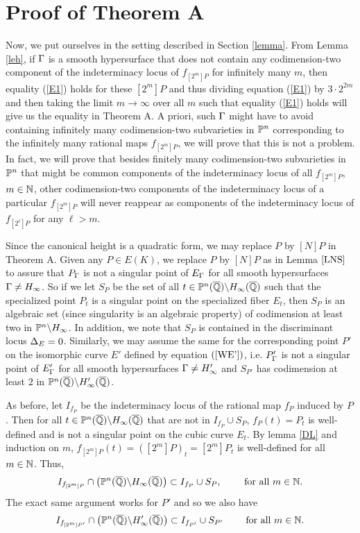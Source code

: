 \documentclass[12pt,reqno]{amsart}
\begin{document}
\section{Proof of Theorem A} \label{P}
Now, we put ourselves in the setting described in Section \ref{lemma}. From Lemma \ref{leh}, if $\Gamma$ is a smooth hypersurface that does not contain any codimension-two component of the indeterminacy locus of $f_{[2^m]P}$ for infinitely many $m$, then equality (\ref{E1}) holds for these $[2^m]P$ and thus dividing equation (\ref{E1}) by $3 \cdot 2^{2m}$ and then taking the  limit $m\rightarrow \infty$ over all $m$ such that equality (\ref{E1}) holds will give us the equality in Theorem A. A priori, such $\Gamma$ might have to avoid containing infinitely many codimension-two subvarieties in $\mathbb{P}^n$ corresponding to the infinitely many rational maps $f_{[2^m]P}$, we will prove that this is not a problem. In fact, we will prove that besides finitely many codimension-two subvarieties in $\mathbb{P}^n$ that might be common components of the indeterminacy locus of all $f_{[2^m]P}$, $m \in \mathbb{N}$, other  codimension-two components of the indeterminacy locus of a particular $f_{[2^m]P}$ will never reappear as components of the indeterminacy locus of  $f_{[2^\ell]P}$ for any $\ell > m$.

Since the canonical height is a quadratic form, we may replace $P$ by $[N]P$ in Theorem A. Given any $P \in E(K)$, we replace $P$ by $[N]P$ as in Lemma $\ref{LNS}$ to assure that $P_\Gamma$ is not a singular point of $E_\Gamma$ for all smooth hypersurfaces $\Gamma \neq H_\infty$. So if we let $S_P$ be the set of all $t \in \mathbb{P}^n(\overline{\mathbb{Q}})\backslash H_\infty(\overline{\mathbb{Q}})$ such that the specialized point $P_t$ is a singular point on the specialized fiber $E_t$, then $S_P$ is an algebraic set (since singularity is an algebraic property) of codimension at least two in $\mathbb{P}^n\backslash H_\infty$. In addition, we note that $S_P$ is contained in the discriminant locus $\Delta_E=0$. Similarly, we may assume the same for the corresponding point $P'$ on the isomorphic curve $E'$ defined by equation $(\ref{WE'})$, i.e. $P'_\Gamma$ is not a singular point of $E'_\Gamma$  for all smooth hypersurfaces $\Gamma \neq H'_\infty$ and $S_{P'}$ has codimension at least $2$ in $\mathbb{P}^n(\overline{\mathbb{Q}})\backslash H'_\infty(\overline{\mathbb{Q}})$.


As before, let $I_{f_P}$ be the indeterminacy locus of the rational map $f_P$ induced by $P$. Then for all $t \in \mathbb{P}^n(\overline{\mathbb{Q}})\backslash H_\infty(\overline{\mathbb{Q}})$ that are not in $I_{f_P} \cup S_P$, $f_P(t)=P_t$ is well-defined and is not a singular point on the cubic curve $E_t$. By lemma \ref{DL} and induction on $m$, $f_{[2^m]P}(t)=\left( [2^m]P\right)_t=[2^m]P_t$ is well-defined for all $m \in \mathbb{N}$. Thus, $$I_{f_{[2^m]P}} \cap \left(\mathbb{P}^n(\overline{\mathbb{Q}})\backslash H_\infty(\overline{\mathbb{Q}}) \right) \subset I_{f_P}\cup S_P, \qquad\text{ for all }m \in \mathbb{N}.$$ The exact same argument works for $P'$ and so we also have $$I_{f_{[2^m]P'}} \cap \left(\mathbb{P}^n(\overline{\mathbb{Q}})\backslash H'_\infty(\overline{\mathbb{Q}}) \right) \subset I_{f_{P'}}\cup S_{P'}\qquad\text{ for all } m \in \mathbb{N}.$$
\end{document}
